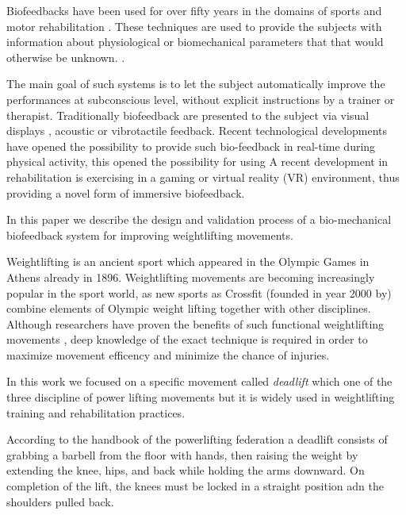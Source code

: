 \documentclass[10pt,letterpaper]{article}
\begin{document}
Biofeedbacks have been used for over fifty years in the domains of sports \cite{onate2001augmented} and motor rehabilitation \cite{tate2016real} . These techniques are used to provide the subjects with information about physiological or biomechanical parameters that that would otherwise be unknown.
\cite{giggins2013biofeedback}. 


The main goal of such systems is to let the subject automatically improve the performances at subconscious level, without explicit instructions by a trainer or therapist.
Traditionally biofeedback are presented to the subject via visual displays , acoustic or vibrotactile feedback. Recent technological developments have opened the possibility to provide such bio-feedback in real-time during physical activity, this opened the possibility for using
A recent development in rehabilitation is exercising in a gaming or virtual reality (VR) environment, thus providing a novel form of immersive biofeedback.

In this paper we describe the design and validation process of a bio-mechanical biofeedback system for improving weightlifting movements.


Weightlifting is an ancient sport which appeared in the Olympic Games in Athens already in 1896. Weightlifting movements are becoming increasingly popular in the sport world, as new sports as Crossfit (founded in year 2000 by) combine elements of Olympic weight lifting together with other disciplines.
Although researchers have proven the benefits of such functional weightlifting movements \cite{smith2013crossfit}, deep knowledge of the exact technique is required in order to maximize movement efficency and minimize the chance of injuries.

In this work we focused on a specific movement called \emph{deadlift} which one of the three discipline of power lifting movements but it is widely used in weightlifting training and rehabilitation practices.

According to the handbook of the powerlifting federation \cite{} a deadlift consists of grabbing a barbell from the floor with hands, then raising the weight by extending the knee, hips, and back while holding the arms downward. On completion of the lift, the knees must be locked in a straight position adn the shoulders pulled back.
\end{document}
